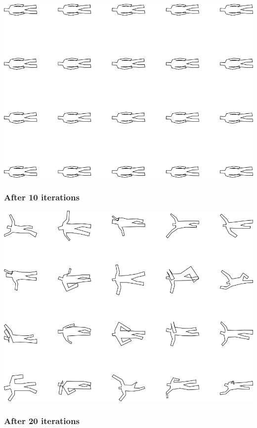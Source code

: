 \includegraphics[width=6in]{output/3.learning/correlated_tuning/correlated_tuning_iter0_.png}
\subsubsection{After 10 iterations}

\includegraphics[width=6in]{output/3.learning/correlated_tuning/correlated_tuning_iter10_.png}
\subsubsection{After 20 iterations}


